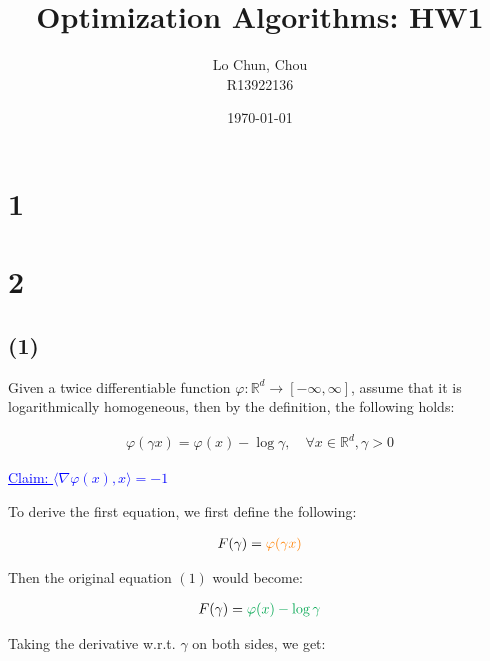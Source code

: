 \documentclass{article}
\title{Optimization Algorithms: HW1}
\author{Lo Chun, Chou \\ R13922136}
\date\today
\begin{document}
\setlength{\parindent}{0pt}
\maketitle 


\section*{1}

\section*{2}

\subsection*{(1)}

Given a twice differentiable function $\varphi: \mathbb{R}^d \to [- \infty, \infty]$, 
assume that it is logarithmically homogeneous, 
then by the definition, the following holds:

\begin{align*}
    \varphi ( \gamma x ) = \varphi (x) - \log \gamma, \quad \forall x \in \mathbb{R}^d, \gamma > 0 \tag{1}
\end{align*}

\textcolor{blue}{\underline{Claim: $\langle \nabla \varphi (x), x \rangle = - 1$ } }
\bigskip

To derive the first equation, we first define the following:

\begin{align*}
    F(\gamma) = \textcolor{orange}{\varphi (\gamma x)}
\end{align*}

Then the original equation $(1)$ would become:

\begin{align*}
    F(\gamma) = \textcolor{Green}{\varphi (x) - \log \gamma}
\end{align*}

Taking the derivative w.r.t. $\gamma$ on both sides, we get:
\end{document}
